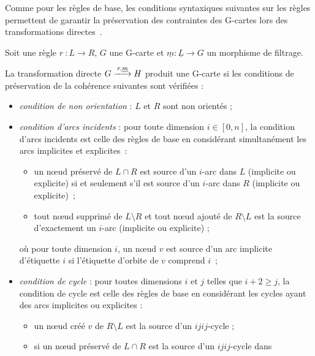 Comme pour les règles de base, les conditions syntaxiques suivantes sur les règles permettent de garantir la préservation des contraintes des G-cartes lors des transformations directes~\cite{pascual2022topological}.

\begin{theoreme}\label{thm:preservation-coherence-topo-regles}%
	Soit une règle $r~: L \longrightarrow R$, $G$ une G-carte et $\underline{m} : \underline{L} \rightarrow G$ un morphisme de filtrage.

	La transformation directe $G \xlongrightarrow{r, \underline{m}} H$ produit
	une G-carte si les conditions de préservation de la cohérence suivantes sont
	vérifiées :
	\begin{itemize}
		\item \emph{condition de non orientation} : $L$ et $R$ sont non orientés ;
		\item \emph{condition d'arcs incidents} : pour toute dimension
		      $i \in [0, n]$, la condition d'arcs incidents est celle des règles de
		      base en considérant simultanément les arcs implicites et
		      explicites~:
		      \begin{itemize}
			      \item un n\oe ud préservé de $L \cap R$ est source d'un $i$-arc dans
			            $L$ (implicite ou explicite) si et seulement s'il est
			            source d'un $i$-arc dans $R$ (implicite ou explicite)~;
			      \item tout n\oe ud supprimé de $L \setminus R$ et tout n\oe ud ajouté de
			            $R \setminus L$ est la source d'exactement un $i$-arc (implicite
			            ou explicite) ;
		      \end{itemize}
		      \vspace{3pt}
		      où pour toute dimension $i$, un n\oe ud $v$ est source d'un arc implicite d'étiquette $i$
		      si l'étiquette d'orbite de $v$ comprend $i$~;
		      \vspace{3pt}
		\item \emph{condition de cycle} : pour toutes dimensions $i$ et $j$ telles que
		      $i+2 \geq j$, la condition de cycle est celle des règles de base en considérant les
		      cycles ayant des arcs implicites ou explicites :
		      \begin{itemize}
			      \item un n\oe ud créé $v$ de $R \setminus L$ est la source d'un $ijij$-cycle ;
			      \item si un n\oe ud préservé de $L \cap R$ est la source d'un $ijij$-cycle dans

\end{itemize}
\end{itemize}
\end{theoreme}
